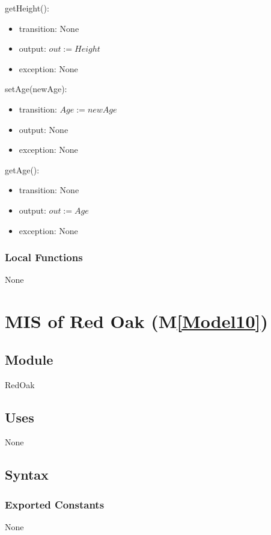 \documentclass[12pt, titlepage]{article}
\newcommand{\mref}[1]{M\ref{#1}}
\begin{document}
\noindent getHeight():
\begin{itemize}
\item transition: None
\item output: $\mathit{out := Height}$
\item exception: None
\end{itemize}
\noindent setAge(newAge):
\begin{itemize}
\item transition: $\mathit{Age := newAge}$
\item output: None
\item exception: None
\end{itemize}
\noindent getAge():
\begin{itemize}
\item transition: None
\item output: $\mathit{out := Age}$
\item exception: None
\end{itemize}

\subsubsection{Local Functions}
None

\newpage

\renewcommand{\tn}{Red Oak }
\renewcommand{\tmn}{RedOak}
\renewcommand{\constn}{Red\ Oak}

\section{MIS of \tn (\mref{Model10})}

\subsection{Module}
\tmn

\subsection{Uses}
None

\subsection{Syntax}
\subsubsection{Exported Constants}
None
\end{document}
